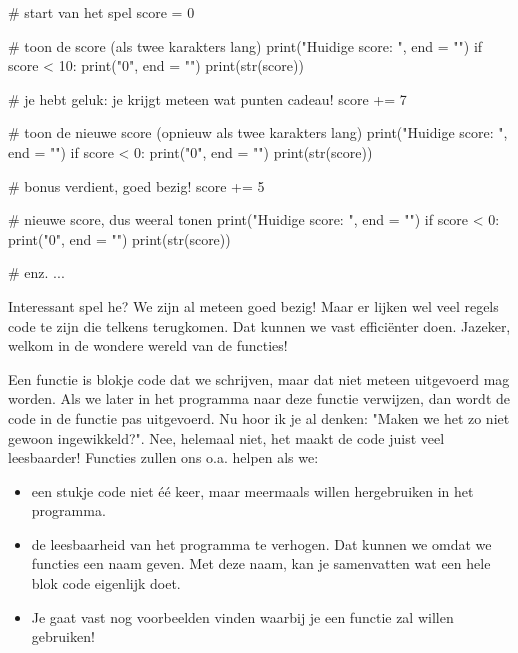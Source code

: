 
\begin{pyEnv}
# start van het spel
score = 0

# toon de score (als twee karakters lang)
print("Huidige score: ", end = "")
if score < 10:
	print("0", end = "")
print(str(score))

# je hebt geluk: je krijgt meteen wat punten cadeau!
score += 7

# toon de nieuwe score (opnieuw als twee karakters lang)
print("Huidige score: ", end = "")
if score < 0:
	print("0", end = "")
print(str(score))

# bonus verdient, goed bezig!
score += 5

# nieuwe score, dus weeral tonen
print("Huidige score: ", end = "")
if score < 0:
	print("0", end = "")
print(str(score))

# enz. ...
\end{pyEnv}
Interessant spel he?
We zijn al meteen goed bezig!
Maar er lijken wel veel regels code te zijn die telkens terugkomen.
Dat kunnen we vast efficiënter doen.
Jazeker, welkom in de wondere wereld van de functies!%
\par
Een functie is blokje code dat we schrijven,
maar dat niet meteen uitgevoerd mag worden.
Als we later in het programma naar deze functie verwijzen,
dan wordt de code in de functie pas uitgevoerd.
Nu hoor ik je al denken: "Maken we het zo niet gewoon ingewikkeld?".
Nee, helemaal niet, het maakt de code juist veel leesbaarder!
Functies zullen ons o.a. helpen als we:
\begin{itemize}
	\item
		een stukje code niet \'e\'e keer,
		maar meermaals willen hergebruiken in het programma.
	\item
		de leesbaarheid van het programma te verhogen.
		Dat kunnen we omdat we functies een naam geven.
		Met deze naam, kan je samenvatten wat een hele blok code eigenlijk doet.
	\item
		Je gaat vast nog voorbeelden vinden waarbij je een functie zal willen gebruiken!
\end{itemize}

